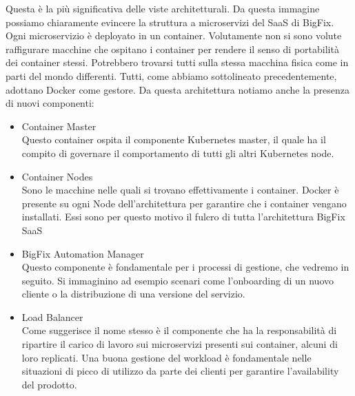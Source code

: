 Questa è la più significativa delle viste architetturali. Da questa immagine possiamo chiaramente evincere la struttura a microservizi del SaaS di BigFix. Ogni microservizio è deployato in un container. Volutamente non si sono volute raffigurare macchine che ospitano i container per rendere il senso di portabilità dei container stessi. Potrebbero trovarsi tutti sulla stessa macchina fisica come in parti del mondo differenti. Tutti, come abbiamo sottolineato precedentemente, adottano Docker come gestore. Da questa architettura notiamo anche la presenza di nuovi componenti:
\begin{itemize}
	\item Container Master \\
	Questo container ospita il componente Kubernetes master, il quale ha il compito di governare il comportamento di tutti gli altri Kubernetes node.
	\item Container Nodes \\
	Sono le macchine nelle quali si trovano effettivamente i container. Docker è presente su ogni Node dell'architettura per garantire che i container vengano installati. Essi sono per questo motivo il fulcro di tutta l'architettura BigFix SaaS
	\item BigFix Automation Manager \\
	Questo componente è fondamentale per i processi di gestione, che vedremo in seguito. Si immaginino ad esempio scenari come l'onboarding di un nuovo cliente o la distribuzione di una versione del servizio.
	\item Load Balancer \\
	Come suggerisce il nome stesso è il componente che ha la responsabilità di ripartire il carico di lavoro sui microservizi presenti sui container, alcuni di loro replicati. Una buona gestione del workload è fondamentale nelle situazioni di picco di utilizzo da parte dei clienti per garantire l'availability del prodotto.
\end{itemize}

